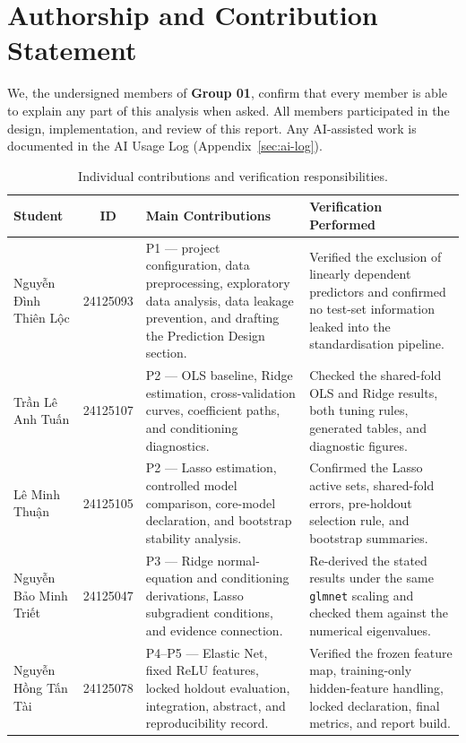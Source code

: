 \section*{Authorship and Contribution Statement}

We, the undersigned members of \textbf{Group 01}, confirm that every member is able
to explain any part of this analysis when asked.  All members participated in
the design, implementation, and review of this report.  Any AI-assisted work
is documented in the AI Usage Log (Appendix~\ref{sec:ai-log}).

\bigskip

\begin{table}[H]
\centering
\caption{Individual contributions and verification responsibilities.}
\label{tab:contributions}
\begin{tabularx}{\textwidth}{l c >{\raggedright\arraybackslash}X >{\raggedright\arraybackslash}X}
\toprule
\textbf{Student} & \textbf{ID} & \textbf{Main Contributions} & \textbf{Verification Performed} \\
\midrule
Nguyễn Đình Thiên Lộc &
    24125093 &
    P1 — project configuration, data preprocessing, exploratory data analysis, data leakage prevention, and drafting the Prediction Design section. &
    Verified the exclusion of linearly dependent predictors and confirmed no test-set information leaked into the standardisation pipeline. \\[6pt]
Trần Lê Anh Tuấn &
    24125107 &
    P2 — OLS baseline, Ridge estimation, cross-validation curves, coefficient paths, and conditioning diagnostics. &
    Checked the shared-fold OLS and Ridge results, both tuning rules, generated tables, and diagnostic figures. \\[6pt]
Lê Minh Thuận &
    24125105 &
    P2 — Lasso estimation, controlled model comparison, core-model declaration, and bootstrap stability analysis. &
    Confirmed the Lasso active sets, shared-fold errors, pre-holdout selection rule, and bootstrap summaries. \\[6pt]
Nguyễn Bảo Minh Triết &
    24125047 &
    P3 — Ridge normal-equation and conditioning derivations, Lasso subgradient conditions, and evidence connection. &
    Re-derived the stated results under the same \texttt{glmnet} scaling and checked them against the numerical eigenvalues. \\[6pt]
Nguyễn Hồng Tấn Tài &
    24125078 &
    P4--P5 — Elastic Net, fixed ReLU features, locked holdout evaluation, integration, abstract, and reproducibility record. &
    Verified the frozen feature map, training-only hidden-feature handling, locked declaration, final metrics, and report build. \\
\bottomrule
\end{tabularx}
\end{table}
